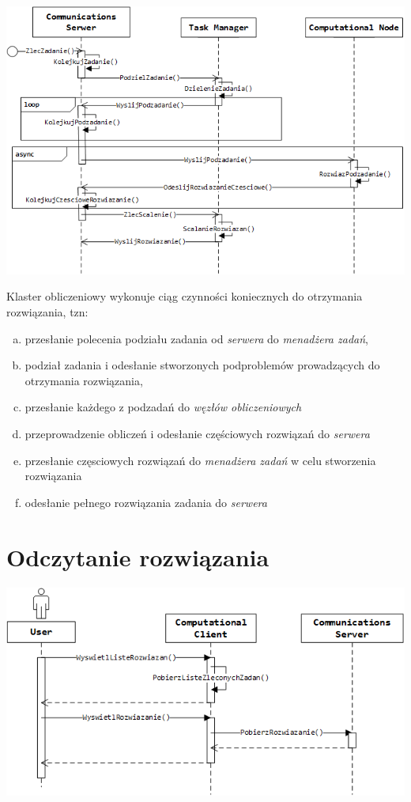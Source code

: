 \documentclass[12pt,a4paper,titlepage]{report}
\begin{document}
	\includegraphics[width=\textwidth]{img/communication/computation.png}

	Klaster obliczeniowy wykonuje ciąg czynności koniecznych do otrzymania rozwiązania, tzn:
	\begin{enumerate}[(a)]
		\item przesłanie polecenia podziału zadania od \textit{serwera} do \textit{menadżera zadań},
		\item podział zadania i odesłanie stworzonych podproblemów prowadzących do otrzymania rozwiązania,
		\item przesłanie każdego z podzadań do \textit{węzłów obliczeniowych}
		\item przeprowadzenie obliczeń i odesłanie częściowych rozwiązań do \textit{serwera}
		\item przesłanie częsciowych rozwiązań do \textit{menadżera zadań} w celu stworzenia rozwiązania
		\item odesłanie pełnego rozwiązania zadania do \textit{serwera}
	\end{enumerate}
    
    \section{Odczytanie rozwiązania}
     \includegraphics[width=\textwidth]{img/communication/getresult.png}
     
\end{document}
